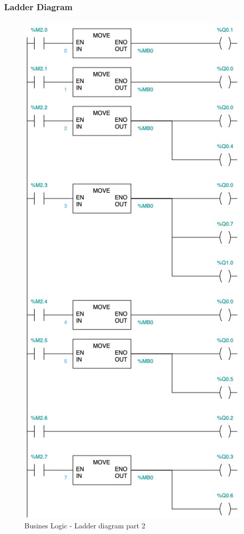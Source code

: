 \documentclass[12pt]{beamer}
\begin{document}
\begin{frame}
\frametitle{Ladder Diagram}
\framesubtitle{}
\begin{figure}
    \centering
    \includegraphics[trim={0 13cm 0 11cm}, clip, scale=.5]{img/Ladder_diagram_3.jpg}
    \caption{Busines Logic - Ladder diagram part 2}
    \label{fig:ladder32}
\end{figure}
\end{frame}
\end{document}
